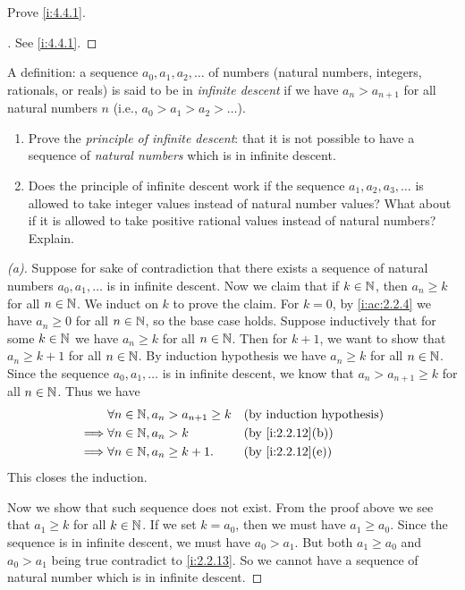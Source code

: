 \exercisesection

\begin{ex}\label{i:ex:4.4.1}
  Prove \cref{i:4.4.1}.
\end{ex}

\begin{proof}[]
  See \cref{i:4.4.1}.
\end{proof}

\begin{ex}\label{i:ex:4.4.2}
  A definition: a sequence \(a_0, a_1, a_2, \dots\) of numbers (natural numbers, integers, rationals, or reals) is said to be in \emph{infinite descent} if we have \(a_n > a_{n + 1}\) for all natural numbers \(n\)
  (i.e., \(a_0 > a_1 > a_2 > \dots\)).
  \begin{enumerate}
    \item Prove the \emph{principle of infinite descent}:
          that it is not possible to have a sequence of \emph{natural numbers} which is in infinite descent.
    \item Does the principle of infinite descent work if the sequence \(a_1, a_2, a_3, \dots\) is allowed to take integer values instead of natural number values?
          What about if it is allowed to take positive rational values instead of natural numbers?
          Explain.
  \end{enumerate}
\end{ex}

\begin{proof}[(a)]
  Suppose for sake of contradiction that there exists a sequence of natural numbers \(a_0, a_1, \dots\) is in infinite descent.
  Now we claim that if \(k \in \mathbb{N}\), then \(a_n \geq k\) for all \(n \in \mathbb{N}\).
  We induct on \(k\) to prove the claim.
  For \(k = 0\), by \cref{i:ac:2.2.4} we have \(a_n \geq 0\) for all \(n \in \mathbb{N}\), so the base case holds.
  Suppose inductively that for some \(k \in \mathbb{N}\) we have \(a_n \geq k\) for all \(n \in \mathbb{N}\).
  Then for \(k + 1\), we want to show that \(a_n \geq k + 1\) for all \(n \in \mathbb{N}\).
  By induction hypothesis we have \(a_n \geq k\) for all \(n \in \mathbb{N}\).
  Since the sequence \(a_0, a_1, \dots\) is in infinite descent, we know that \(a_n > a_{n + 1} \geq k\) for all \(n \in \mathbb{N}\).
  Thus we have
  \begin{align*}
             & \forall n \in \N, a_n > a_{n + 1} \geq k &  & \byIH            \\
    \implies & \forall n \in \N, a_n > k                &  & \by{i:2.2.12}[b] \\
    \implies & \forall n \in \N, a_n \geq k + 1.        &  & \by{i:2.2.12}[e]
  \end{align*}
  This closes the induction.

  Now we show that such sequence does not exist.
  From the proof above we see that \(a_1 \geq k\) for all \(k \in \mathbb{N}\).
  If we set \(k = a_0\), then we must have \(a_1 \geq a_0\).
  Since the sequence is in infinite descent, we must have \(a_0 > a_1\).
  But both \(a_1 \geq a_0\) and \(a_0 > a_1\) being true contradict to \cref{i:2.2.13}.
  So we cannot have a sequence of natural number which is in infinite descent.
\end{proof}

